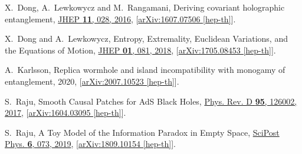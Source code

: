 \documentclass[12pt]{article}
\numberwithin{equation}{section}
\begin{document}
\begin{thebibliography}{10}
X.~Dong, A.~Lewkowycz and M.~Rangamani, {{Deriving covariant holographic
  entanglement}}, \href{http://dx.doi.org/10.1007/JHEP11(2016)028}{JHEP {\bf
  11}, 028, 2016},
  [\href{http://arxiv.org/abs/arXiv:1607.07506}{{arXiv:1607.07506 [hep-th]}}].

X.~Dong and A.~Lewkowycz, {{Entropy, Extremality, Euclidean Variations, and the
  Equations of Motion}}, \href{http://dx.doi.org/10.1007/JHEP01(2018)081}{JHEP
  {\bf 01}, 081, 2018},
  [\href{http://arxiv.org/abs/arXiv:1705.08453}{{arXiv:1705.08453 [hep-th]}}].

A.~Karlsson, {{Replica wormhole and island incompatibility with monogamy of
  entanglement}},  2020,
  [\href{http://arxiv.org/abs/arXiv:2007.10523}{{arXiv:2007.10523 [hep-th]}}].

S.~Raju, {{Smooth Causal Patches for AdS Black Holes}},
  \href{http://dx.doi.org/10.1103/PhysRevD.95.126002}{Phys. Rev. D {\bf 95},
  126002, 2017},
  [\href{http://arxiv.org/abs/arXiv:1604.03095}{{arXiv:1604.03095 [hep-th]}}].

S.~Raju, {{A Toy Model of the Information Paradox in Empty Space}},
  \href{http://dx.doi.org/10.21468/SciPostPhys.6.6.073}{SciPost Phys. {\bf 6},
  073, 2019}, [\href{http://arxiv.org/abs/arXiv:1809.10154}{{arXiv:1809.10154
  [hep-th]}}].

\end{thebibliography}\endgroup
\end{document}
